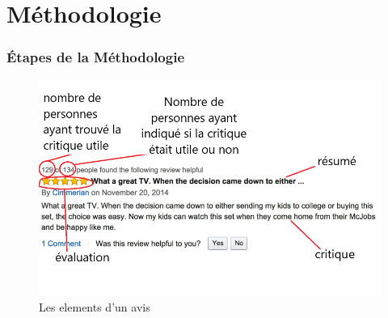 \section{Méthodologie}
\begin{frame}
    \frametitle{Étapes de la Méthodologie}
    \begin{figure}
        \includegraphics[scale=0.3]{Figures/amazonReviewDetails.png}
        \caption{Les elements d’un avis}
    \end{figure}
\end{frame}
